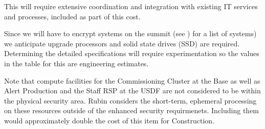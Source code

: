 This will require extensive coordination and integration with existing \gls{IT}
services and processes, included as part of this cost.

Since we will have to encrypt systems on the summit (see ) for a list of systems)
we anticipate upgrade processors and solid state drives (\gls{SSD}) are required. Determining the detailed specifications will require experimentation so the
values in the table for this are engineering estimates.

Note that compute facilities for the \gls{Commissioning} Cluster at the Base as well as Alert Production and the Staff RSP at the USDF are not considered to be within the physical security area.
Rubin considers the short-term, ephemeral processing on these resources outside of the enhanced security requirmenets. Including them would approximately double the cost of this item for \gls{Construction}.
